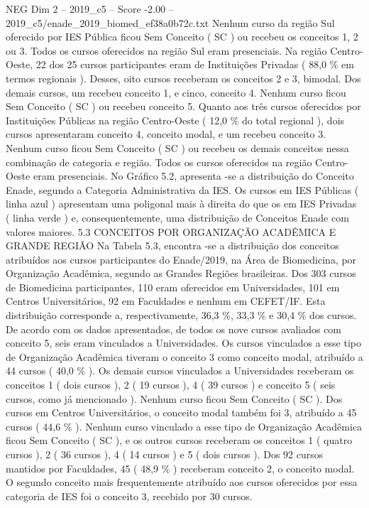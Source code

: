 \begin{textsample}{NEG Dim 2 – 2019\_c5 – Score -2.00 – 2019\_c5/enade\_2019\_biomed\_ef38a0b72c.txt}
Nenhum curso da região Sul oferecido por IES Pública ficou Sem Conceito ( SC ) ou recebeu os conceitos 1, 2 ou 3.
Todos os cursos oferecidos na região Sul eram presenciais.
Na região Centro-Oeste, 22 dos 25 cursos participantes eram de Instituições Privadas ( 88,0 \% em termos regionais ).
Desses, oito cursos receberam os conceitos 2 e 3, bimodal.
Dos demais cursos, um recebeu conceito 1, e cinco, conceito 4.
Nenhum curso ficou Sem Conceito ( SC ) ou recebeu conceito 5.
Quanto aos três cursos oferecidos por Instituições Públicas na região Centro-Oeste ( 12,0 \% do total regional ), dois cursos apresentaram conceito 4, conceito modal, e um recebeu conceito 3.
Nenhum curso ficou Sem Conceito ( SC ) ou recebeu os demais conceitos nessa combinação de categoria e região.
Todos os cursos oferecidos na região Centro-Oeste eram presenciais.
No Gráfico 5.2, apresenta -se a distribuição do Conceito Enade, segundo a Categoria Administrativa da IES.
Os cursos em IES Públicas ( linha azul ) apresentam uma poligonal mais à direita do que os em IES Privadas ( linha verde ) e, consequentemente, uma distribuição de Conceitos Enade com valores maiores. 5.3 CONCEITOS POR ORGANIZAÇÃO ACADÊMICA E GRANDE REGIÃO Na Tabela 5.3, encontra -se a distribuição dos conceitos atribuídos aos cursos participantes do Enade/2019, na Área de Biomedicina, por Organização Acadêmica, segundo as Grandes Regiões brasileiras.
Dos 303 cursos de Biomedicina participantes, 110 eram oferecidos em Universidades, 101 em Centros Universitários, 92 em Faculdades e nenhum em CEFET/IF.
Esta distribuição corresponde a, respectivamente, 36,3 \%, 33,3 \% e 30,4 \% dos cursos.
De acordo com os dados apresentados, de todos os nove cursos avaliados com conceito 5, seis eram vinculados a Universidades.
Os cursos vinculados a esse tipo de Organização Acadêmica tiveram o conceito 3 como conceito modal, atribuído a 44 cursos ( 40,0 \% ).
Os demais cursos vinculados a Universidades receberam os conceitos 1 ( dois cursos ), 2 ( 19 cursos ), 4 ( 39 cursos ) e conceito 5 ( seis cursos, como já mencionado ).
Nenhum curso ficou Sem Conceito ( SC ).
Dos cursos em Centros Universitários, o conceito modal também foi 3, atribuído a 45 cursos ( 44,6 \% ).
Nenhum curso vinculado a esse tipo de Organização Acadêmica ficou Sem Conceito ( SC ), e os outros cursos receberam os conceitos 1 ( quatro cursos ), 2 ( 36 cursos ), 4 ( 14 cursos ) e 5 ( dois cursos ).
Dos 92 cursos mantidos por Faculdades, 45 ( 48,9 \% ) receberam conceito 2, o conceito modal.
O segundo conceito mais frequentemente atribuído aos cursos oferecidos por essa categoria de IES foi o conceito 3, recebido por 30 cursos.

\end{textsample}
